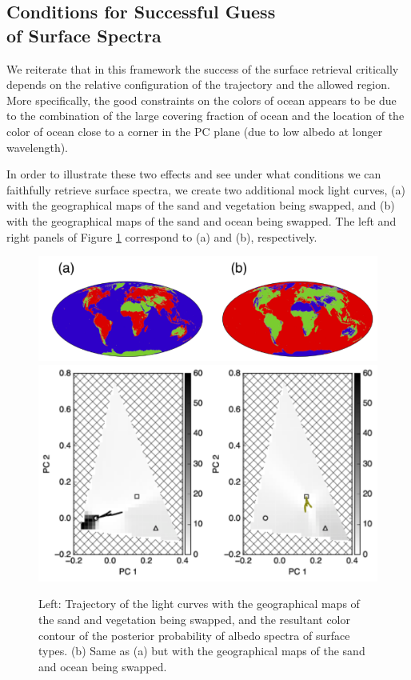 \documentclass[iop,numberedappendix,apj]{emulateapj}
\begin{document}
\subsection{Conditions for Successful Guess\\of Surface Spectra}
\label{ss:guess}


We reiterate that in this framework the success of the surface retrieval critically depends on the relative configuration of the trajectory and the allowed region. 
More specifically, the good constraints on the colors of ocean appears to be due to the combination of the large covering fraction of ocean and the location of the color of ocean close to a corner in the PC plane (due to low albedo at longer wavelength). 

In order to illustrate these two effects and see under what conditions we can faithfully retrieve surface spectra, we create two additional mock light curves, (a) with the geographical maps of the sand and vegetation being swapped, and  (b) with the geographical maps of the sand and ocean being swapped. 
The left and right panels of Figure \ref{fig:swap} correspond to (a) and (b), respectively. 

\begin{figure}[htb!]
    \begin{center}
    \includegraphics[width=\hsize]{swap_map.pdf}
    \includegraphics[width=\hsize]{mockdata_90deg_3types23_t360_lc_noreg_allowedregion_gray.pdf}
    \end{center}
    \caption{Left: Trajectory of the light curves with the geographical maps of the sand and vegetation being swapped, and the resultant color contour of the posterior probability of albedo spectra of surface types. (b) Same as (a) but with the geographical maps of the sand and ocean being swapped.}
\label{fig:swap}
\end{figure}
\end{document}
